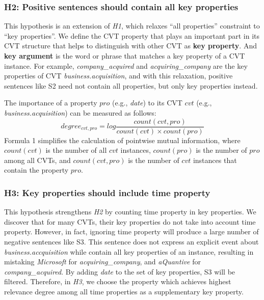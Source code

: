 \subsubsection{H2: Positive sentences should contain all key properties}
This hypothesis is an extension of \emph{H1}, which relaxes ``all properties'' constraint to ``key properties''. We define the CVT property that plays an important part in its CVT structure that helps to distinguish with other CVT as \textbf{key property}. And \textbf{key argument} is the word or phrase that matches a key property of a CVT instance. For example, \emph{company\_acquired} and \emph{acquiring\_company} are the key properties of CVT \emph{business.acquisition}, and with this relaxation, positive sentences like S2 need not contain all properties, but only key properties instead.

The importance of a property $pro$ (e.g., \emph{date}) to its CVT $cvt$ (e.g., \emph{business.acquisition}) can be measured as follows:
\begin{equation}
	degree_{cvt, pro} = log \frac{count(cvt, pro)}{count(cvt) \times count(pro)} 
\end{equation}
Formula 1 simplifies the calculation of pointwise mutual information, where $count(cvt)$ is the number of all $cvt$ instances, $count(pro)$ is the number of $pro$ among all CVTs, and $count(cvt, pro)$ is the number of $cvt$ instances that contain the property $pro$.

\subsubsection{H3: Key properties should include time property}
This hypothesis strengthens \emph{H2} by counting time property in key properties. We discover that for many CVTs, their key properties do not take into account time property. However, in fact, ignoring time property will produce a large number of negative sentences like S3. This sentence does not express an explicit event about \emph{business.accquisition} while contain all key properties of an instance, resulting in mistaking \emph{Microsoft} for \emph{acquiring\_company}, and \emph{aQuantive} for \emph{company\_acquired}. By adding \emph{date} to the set of key properties, S3 will be filtered. Therefore, in \emph{H3}, we choose the property which achieves highest relevance degree among all time properties as a supplementary key property. 

